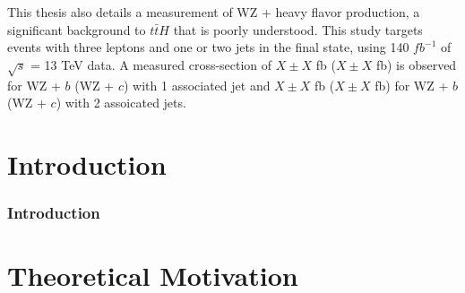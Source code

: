 \documentclass[12pt]{report}	%
\theoremstyle{definition}
\theoremstyle{remark}
\begin{document}
\par This thesis also details a measurement of WZ + heavy flavor production, a significant background to $t\bar{t}H$ that is poorly understood. This study targets events with three leptons and one or two jets in the final state, using 140 $fb^{-1}$ of  $\sqrt{s}$ = 13 TeV data. A measured cross-section of $X\pm X$ fb ($X\pm X$ fb) is observed for WZ + $b$ (WZ + $c$) with 1 associated jet and $X\pm X$ fb ($X\pm X$ fb) for WZ + $b$ (WZ + $c$) with 2 assoicated jets.



\tableofcontents   %

\listoftables      %
\listoffigures     %



%
%
\part{Introduction}
\label{part:intro}


\section{Introduction}
\label{sec:intro}


\part{Theoretical Motivation}
\label{part:theory}
\end{document}
